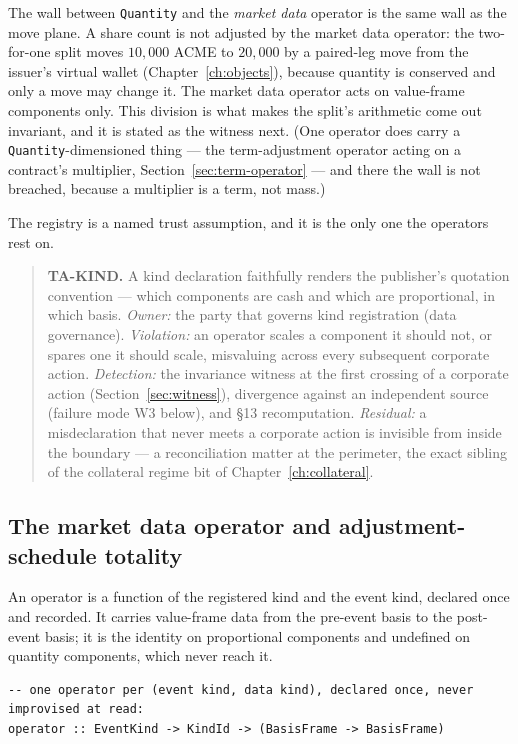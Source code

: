 \documentclass[11pt,a4paper]{article}
\begin{document}
The wall between \texttt{Quantity} and the \emph{market data} operator is the same wall as
the move plane. A share count is not adjusted by the market data operator: the two-for-one
split moves $10{,}000$ ACME to $20{,}000$ by a paired-leg move from the issuer's virtual
wallet (Chapter~\ref{ch:objects}), because quantity is conserved and only a move may change
it. The market data operator acts on value-frame components only. This division is what makes
the split's arithmetic come out invariant, and it is stated as the witness next. (One
operator does carry a \texttt{Quantity}-dimensioned thing --- the term-adjustment operator
acting on a contract's multiplier, Section~\ref{sec:term-operator} --- and there the wall is
not breached, because a multiplier is a term, not mass.)

The registry is a named trust assumption, and it is the only one the operators rest on.

\begin{quote}
\textbf{TA-KIND.} A kind declaration faithfully renders the publisher's quotation
convention --- which components are cash and which are proportional, in which basis.
\emph{Owner:} the party that governs kind registration (data governance). \emph{Violation:}
an operator scales a component it should not, or spares one it should scale, misvaluing
across every subsequent corporate action. \emph{Detection:} the invariance witness at the
first crossing of a corporate action (Section~\ref{sec:witness}), divergence against an
independent source (failure mode W3 below), and \S 13 recomputation. \emph{Residual:} a
misdeclaration that never meets a corporate action is invisible from inside the boundary
--- a reconciliation matter at the perimeter, the exact sibling of the collateral regime
bit of Chapter~\ref{ch:collateral}.
\end{quote}

\subsection{The market data operator and adjustment-schedule totality}\label{sec:operator}

An operator is a function of the registered kind and the event kind, declared once and
recorded. It carries value-frame data from the pre-event basis to the post-event basis;
it is the identity on proportional components and undefined on quantity components, which
never reach it.

\begin{lstlisting}
-- one operator per (event kind, data kind), declared once, never improvised at read:
operator :: EventKind -> KindId -> (BasisFrame -> BasisFrame)
\end{lstlisting}
\end{document}
